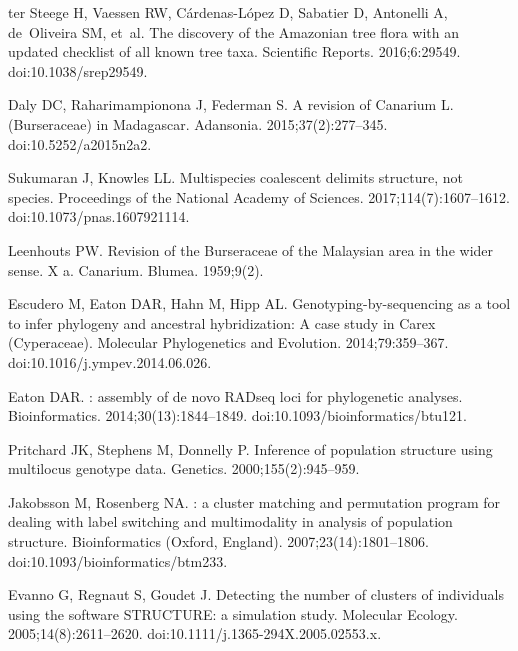 \documentclass[10pt,letterpaper]{article}
\begin{document}
\begin{thebibliography}{10}
  ter Steege H, Vaessen RW, Cárdenas-López D, Sabatier D, Antonelli A,
  de~Oliveira SM, et~al.
  \newblock The discovery of the {Amazonian} tree flora with an updated checklist of all known tree taxa.
  \newblock Scientific Reports. 2016;6:29549.
  \newblock doi:{10.1038/srep29549}.

  Daly DC, Raharimampionona J, Federman S.
  \newblock A revision of {Canarium} {L}. ({Burseraceae}) in {Madagascar}.
  \newblock Adansonia. 2015;37(2):277--345.
  \newblock doi:{10.5252/a2015n2a2}.

  Sukumaran J, Knowles LL.
  \newblock Multispecies coalescent delimits structure, not species.
  \newblock Proceedings of the National Academy of Sciences.
  2017;114(7):1607--1612.
  \newblock doi:{10.1073/pnas.1607921114}.

  Leenhouts PW.
  \newblock Revision of the {Burseraceae} of the {Malaysian} area in the wider
  sense. {X} a. {Canarium}.
  \newblock Blumea. 1959;9(2).

  Escudero M, Eaton DAR, Hahn M, Hipp AL.
  \newblock Genotyping-by-sequencing as a tool to infer phylogeny and ancestral
  hybridization: {A} case study in {Carex} ({Cyperaceae}).
  \newblock Molecular Phylogenetics and Evolution. 2014;79:359--367.
  \newblock doi:{10.1016/j.ympev.2014.06.026}.

  Eaton DAR.
  : assembly of de novo {RADseq} loci for phylogenetic analyses.
  \newblock Bioinformatics. 2014;30(13):1844--1849.
  \newblock doi:{10.1093/bioinformatics/btu121}.

  Pritchard JK, Stephens M, Donnelly P.
  \newblock Inference of population structure using multilocus genotype data.
  \newblock Genetics. 2000;155(2):945--959.

  Jakobsson M, Rosenberg NA.
  : a cluster matching and permutation program for dealing with label switching and multimodality in analysis of population structure.
  \newblock Bioinformatics (Oxford, England). 2007;23(14):1801--1806.
  \newblock doi:{10.1093/bioinformatics/btm233}.

  Evanno G, Regnaut S, Goudet J.
  \newblock Detecting the number of clusters of individuals using the software
  {STRUCTURE}: a simulation study.
  \newblock Molecular Ecology. 2005;14(8):2611--2620.
  \newblock doi:{10.1111/j.1365-294X.2005.02553.x}.


\end{thebibliography}
\end{document}
